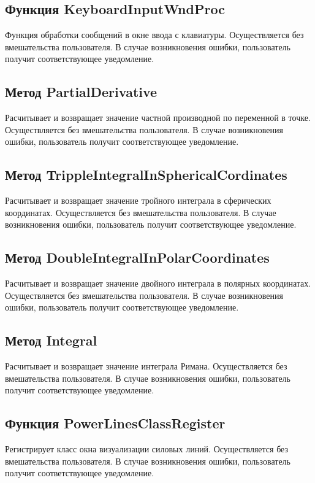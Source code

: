\documentclass[14pt,a4paper,final]{extreport}
\begin{document}
\subsection{Функция KeyboardInputWndProc}
Функция обработки сообщений в окне ввода с клавиатуры. Осуществляется без вмешательства пользователя. 
В случае возникновения ошибки, пользователь получит соответствующее уведомление.

\subsection{Метод PartialDerivative}
Расчитывает и возвращает значение частной производной по переменной в точке. Осуществляется без вмешательства пользователя. 
В случае возникновения ошибки, пользователь получит соответствующее уведомление.

\subsection{Метод TrippleIntegralInSphericalCordinates}
Расчитывает и возвращает значение тройного интеграла в сферических координатах. Осуществляется без вмешательства пользователя. 
В случае возникновения ошибки, пользователь получит соответствующее уведомление.

\subsection{Метод DoubleIntegralInPolarCoordinates}
Расчитывает и возвращает значение двойного интеграла в полярных координатах. Осуществляется без вмешательства пользователя. 
В случае возникновения ошибки, пользователь получит соответствующее уведомление.

\subsection{Метод Integral}
Расчитывает и возвращает значение интеграла Римана. Осуществляется без вмешательства пользователя. 
В случае возникновения ошибки, пользователь получит соответствующее уведомление.

\subsection{Функция PowerLinesClassRegister}
Регистрирует класс окна визуализации силовых линий. Осуществляется без вмешательства пользователя. 
В случае возникновения ошибки, пользователь получит соответствующее уведомление.
\end{document}
